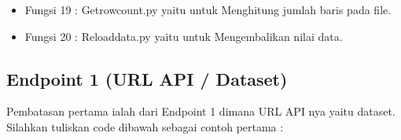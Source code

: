 \begin{enumerate}
\begin{itemize}
            
        \item Fungsi 19 : Getrowcount.py yaitu untuk Menghitung jumlah baris pada file.
            
        \item Fungsi 20 : Reloaddata.py yaitu untuk Mengembalikan nilai data.
            
      \end{itemize}

 \subsection{Endpoint 1 (URL API / Dataset)}
  Pembatasan pertama ialah dari Endpoint 1 dimana URL API nya yaitu dataset. Silahkan tuliskan code dibawah sebagai contoh pertama :
  


\end{enumerate}
